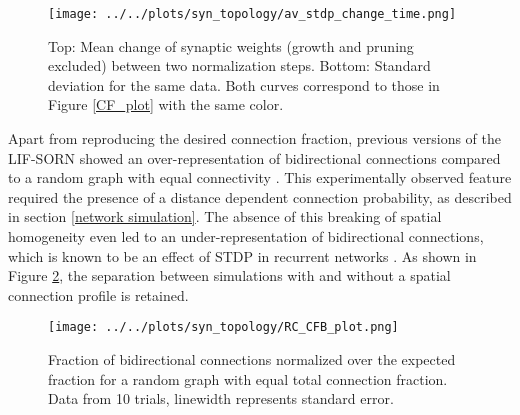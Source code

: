 \documentclass[10pt,a4paper]{article}
\begin{document}
\begin{figure}
\texttt{[image: ../../plots/syn\_topology/av\_stdp\_change\_time.png]}
\caption{Top: Mean change of synaptic weights (growth and pruning excluded) between two normalization steps. Bottom: Standard deviation for the same data. Both curves correspond to those in Figure \ref{CF_plot} with the same color.}
\label{STDP_change}
\end{figure}
Apart from reproducing the desired connection fraction, previous versions of the LIF-SORN showed an over-representation of bidirectional connections compared to a random graph with equal connectivity \cite{SORN_Paper}. This experimentally observed feature \cite{Markram_Connections_1997,Song_Connectivity_2005} required the presence of a distance dependent connection probability, as described in section \ref{network simulation}. The absence of this breaking of spatial homogeneity even led to an under-representation of bidirectional connections, which is known to be an effect of STDP in recurrent networks \cite{Syn_Plast_Abbott}. As shown in Figure \ref{RC_CFB_plot}, the separation between simulations with and without a spatial connection profile is retained. 
\begin{figure}
\texttt{[image: ../../plots/syn\_topology/RC\_CFB\_plot.png]}
\caption{Fraction of bidirectional connections normalized over the expected fraction for a random graph with equal total connection fraction. Data from 10 trials, linewidth represents standard error.}
\label{RC_CFB_plot}
\end{figure}
\end{document}
